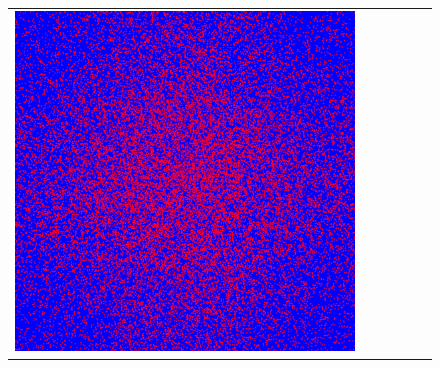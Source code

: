 \documentclass[12pt, reqno]{report}
\theoremstyle{definition}
\theoremstyle{remark}
\begin{document}
\begin{figure}[H]
\begin{tabular}{rccccc}
        \includegraphics[align = c, height=\subheight]{media_paper/diff1000.png} \\


\end{tabular}
\end{figure}
\end{document}
